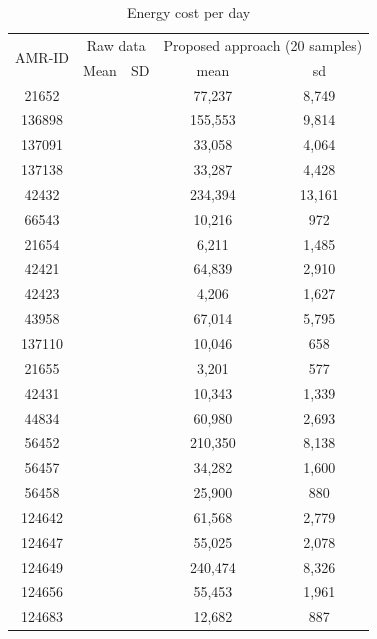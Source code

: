 \documentclass[conference]{IEEEtran}
\begin{document}
\begin{table}[]
  \caption{Energy cost per day}
  \begin{center}
  \begin{tabular}{ccccc}
  \hline
  \multirow{2}{*}{AMR-ID} & \multicolumn{2}{c}{Raw data}               & \multicolumn{2}{c}{Proposed approach (20 samples)}\\
                          & \multicolumn{1}{c}{Mean} & \multicolumn{1}{c}{SD} & \multicolumn{1}{c}{mean}  & \multicolumn{1}{c}{sd} \\
  \hline
                          21652 & & & 77,237 & 8,749 \\
                          136898 & & & 155,553 & 9,814 \\
                          137091 & & & 33,058 & 4,064 \\
                          137138 & & & 33,287 & 4,428 \\
                          42432 & & & 234,394 & 13,161 \\
                          66543 & & & 10,216 & 972 \\
                          21654 & & & 6,211 & 1,485 \\
                          42421 & & & 64,839 & 2,910 \\
                          42423 & & & 4,206 & 1,627 \\
                          43958 & & & 67,014 & 5,795 \\
                          137110 & & & 10,046 & 658 \\
                          21655 & & & 3,201 & 577 \\
                          42431 & & & 10,343 & 1,339 \\
                          44834 & & & 60,980 & 2,693 \\
                          56452 & & & 210,350 & 8,138 \\
                          56457 & & & 34,282 & 1,600 \\
                          56458 & & & 25,900 & 880 \\
                          124642 & & & 61,568 & 2,779 \\
                          124647 & & & 55,025 & 2,078 \\
                          124649 & & & 240,474 & 8,326 \\
                          124656 & & & 55,453 & 1,961 \\
                          124683 & & & 12,682 & 887 \\

\end{tabular}
\end{center}
\end{table}
\end{document}
